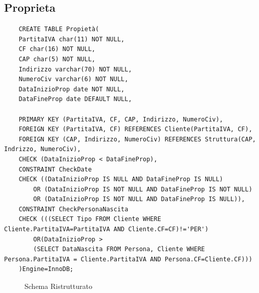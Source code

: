 \documentclass{elegantbook}
\begin{document}
\subsection{Proprieta}
\begin{verbatim}
	CREATE TABLE Propietà(
	PartitaIVA char(11) NOT NULL,
	CF char(16) NOT NULL,
	CAP char(5) NOT NULL,
	Indirizzo varchar(70) NOT NULL,
	NumeroCiv varchar(6) NOT NULL,
	DataInizioProp date NOT NULL,
	DataFineProp date DEFAULT NULL,
	
	PRIMARY KEY (PartitaIVA, CF, CAP, Indirizzo, NumeroCiv),
	FOREIGN KEY (PartitaIVA, CF) REFERENCES Cliente(PartitaIVA, CF),
	FOREIGN KEY (CAP, Indirizzo, NumeroCiv) REFERENCES Struttura(CAP, Indrizzo, NumeroCiv),
	CHECK (DataInizioProp < DataFineProp),
	CONSTRAINT CheckDate 
	CHECK ((DataInizioProp IS NULL AND DataFineProp IS NULL) 
		OR (DataInizioProp IS NOT NULL AND DataFineProp IS NOT NULL) 
		OR (DataInizioProp IS NOT NULL AND DataFineProp IS NULL)),
	CONSTRAINT CheckPersonaNascita 
	CHECK (((SELECT Tipo FROM Cliente WHERE Cliente.PartitaIVA=PartitaIVA AND Cliente.CF=CF)!='PER')
		OR(DataInizioProp > 
		(SELECT DataNascita FROM Persona, Cliente WHERE Persona.PartitaIVA = Cliente.PartitaIVA AND Persona.CF=Cliente.CF)))
	)Engine=InnoDB;
\end{verbatim}
\begin{figure}[H]
	\centering
	\caption{Schema Ristrutturato}
\end{figure}
\end{document}
